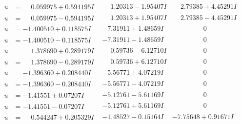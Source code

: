 \documentclass[1p]{elsarticle_modified}
\theoremstyle{definition}
\begin{document}
$$\begin{array}{c|c|c}
\begin{aligned}
u &= \phantom{-}0.059975 + 0.594195 I\end{aligned}
 & \phantom{-}1.20313 - 1.95407 I & \phantom{-}2.79385 + 4.45291 I \\ \hline\begin{aligned}
u &= \phantom{-}0.059975 - 0.594195 I\end{aligned}
 & \phantom{-}1.20313 + 1.95407 I & \phantom{-}2.79385 - 4.45291 I \\ \hline\begin{aligned}
u &= -1.400510 + 0.118575 I\end{aligned}
 & -7.31911 + 1.48659 I & \phantom{-0.000000 } 0 \\ \hline\begin{aligned}
u &= -1.400510 - 0.118575 I\end{aligned}
 & -7.31911 - 1.48659 I & \phantom{-0.000000 } 0 \\ \hline\begin{aligned}
u &= \phantom{-}1.378690 + 0.289179 I\end{aligned}
 & \phantom{-}0.59736 - 6.12710 I & \phantom{-0.000000 } 0 \\ \hline\begin{aligned}
u &= \phantom{-}1.378690 - 0.289179 I\end{aligned}
 & \phantom{-}0.59736 + 6.12710 I & \phantom{-0.000000 } 0 \\ \hline\begin{aligned}
u &= -1.396360 + 0.208440 I\end{aligned}
 & -5.56771 + 4.07219 I & \phantom{-0.000000 } 0 \\ \hline\begin{aligned}
u &= -1.396360 - 0.208440 I\end{aligned}
 & -5.56771 - 4.07219 I & \phantom{-0.000000 } 0 \\ \hline\begin{aligned}
u &= -1.41551 + 0.07207 I\end{aligned}
 & -5.12761 - 5.61169 I & \phantom{-0.000000 } 0 \\ \hline\begin{aligned}
u &= -1.41551 - 0.07207 I\end{aligned}
 & -5.12761 + 5.61169 I & \phantom{-0.000000 } 0 \\ \hline\begin{aligned}
u &= \phantom{-}0.544247 + 0.205329 I\end{aligned}
 & -1.48527 - 0.15164 I & -7.75648 + 0.91671 I \\ \hline\begin{aligned}

\end{aligned}
\end{array}$$
\end{document}
